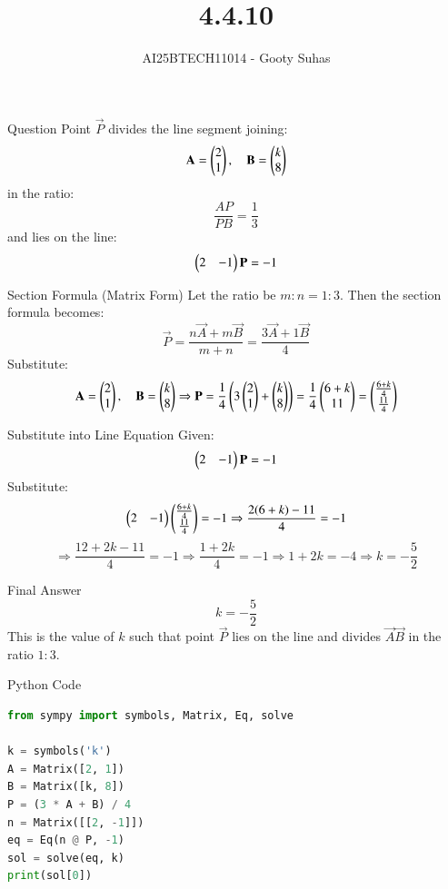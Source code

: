 \documentclass{beamer}
\title{4.4.10}
\author{AI25BTECH11014 - Gooty Suhas}
\begin{document}
\frame{\titlepage}

\begin{frame}{Question}
Point \( \vec{P} \) divides the line segment joining:
\[
\mathbf{A} = \begin{pmatrix}2 \\ 1\end{pmatrix},\quad
\mathbf{B} = \begin{pmatrix}k \\ 8\end{pmatrix}
\]
in the ratio:
\[
\frac{AP}{PB} = \frac{1}{3}
\]
and lies on the line:
\[
\begin{pmatrix}2 & -1\end{pmatrix} \mathbf{P} = -1
\]
\end{frame}

\begin{frame}{Section Formula (Matrix Form)}
Let the ratio be \( m:n = 1:3 \).  
Then the section formula becomes:
\[
\vec{P} = \frac{n\vec{A} + m\vec{B}}{m + n}
= \frac{3\vec{A} + 1\vec{B}}{4}
\]
Substitute:
\[
\mathbf{A} = \begin{pmatrix}2 \\ 1\end{pmatrix},\quad \mathbf{B} = \begin{pmatrix}k \\ 8\end{pmatrix}
\Rightarrow
\mathbf{P} = \frac{1}{4} \left( 3 \begin{pmatrix}2 \\ 1\end{pmatrix} + \begin{pmatrix}k \\ 8\end{pmatrix} \right)
= \frac{1}{4} \begin{pmatrix}6 + k \\ 11\end{pmatrix}
= \begin{pmatrix}\frac{6 + k}{4} \\ \frac{11}{4}\end{pmatrix}
\]
\end{frame}




\begin{frame}{Substitute into Line Equation}
Given:
\[
\begin{pmatrix}2 & -1\end{pmatrix} \mathbf{P} = -1
\]
Substitute:
\[
\begin{pmatrix}2 & -1\end{pmatrix} \begin{pmatrix}\frac{6 + k}{4} \\ \frac{11}{4}\end{pmatrix} = -1
\Rightarrow \frac{2(6 + k) - 11}{4} = -1
\]
\[
\Rightarrow \frac{12 + 2k - 11}{4} = -1
\Rightarrow \frac{1 + 2k}{4} = -1
\Rightarrow 1 + 2k = -4
\Rightarrow k = -\frac{5}{2}
\]
\end{frame}



\begin{frame}{Final Answer}
\[
\boxed{k = -\frac{5}{2}}
\]
This is the value of \( k \) such that point \( \vec{P} \) lies on the line and divides \( \vec{A}\vec{B} \) in the ratio \( 1:3 \).
\end{frame}


\begin{frame}[fragile]{Python Code }
\begin{lstlisting}[language=Python]
from sympy import symbols, Matrix, Eq, solve

k = symbols('k')
A = Matrix([2, 1])
B = Matrix([k, 8])
P = (3 * A + B) / 4
n = Matrix([[2, -1]])
eq = Eq(n @ P, -1)
sol = solve(eq, k)
print(sol[0])
\end{lstlisting}
\end{frame}
\end{document}
